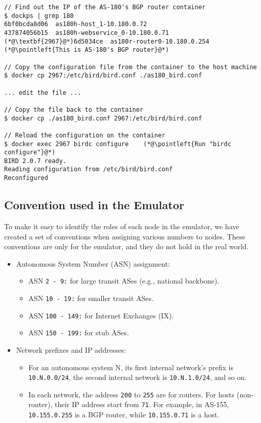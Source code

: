 \begin{lstlisting}
// Find out the IP of the AS-180's BGP router container
$ dockps | grep 180
6bf0bcda8d06  as180h-host_1-10.180.0.72
437874056b15  as180h-webservice_0-10.180.0.71
(*@\textbf{2967}@*)6d5034ce  as180r-router0-10.180.0.254     (*@\pointleft{This is AS-180's BGP router}@*) 

// Copy the configuration file from the container to the host machine
$ docker cp 2967:/etc/bird/bird.conf ./as180_bird.conf

... edit the file ...

// Copy the file back to the container 
$ docker cp ./as180_bird.conf 2967:/etc/bird/bird.conf 

// Reload the configuration on the container
$ docker exec 2967 birdc configure    (*@\pointleft{Run "birdc configure"}@*) 
BIRD 2.0.7 ready.
Reading configuration from /etc/bird/bird.conf
Reconfigured
\end{lstlisting}
 

\subsection{Convention used in the Emulator}

To make it easy to identify the roles of each node in the 
emulator, we have created a set of conventions when assigning
various numbers to nodes. 
These conventions are only for the emulator, and they
do not hold in the real world. 

\begin{itemize}
  \item Autonomous System Number (ASN) assignment:
    \begin{itemize}
      \item ASN \texttt{2 - 9:} for large transit ASes (e.g., national backbone).
      \item ASN \texttt{10 - 19:} for smaller transit ASes.
      \item ASN \texttt{100 - 149:} for Internet Exchanges (IX).
      \item ASN \texttt{150 - 199:} for stub ASes. 
    \end{itemize}

  \item Network prefixes and IP addresses:
    
    \begin{itemize}
      \item For an autonomous system N, its first internal network's prefix
	is \texttt{10.N.0.0/24}, the second internal network
	is \texttt{10.N.1.0/24}, and so on.
   
      \item In each network, the address \texttt{200} to \texttt{255} 
	are for routers. For hosts (non-router), their IP address 
	start from \texttt{71}. For example, in AS-155, 
	\texttt{10.155.0.255} is a BGP router, while \texttt{10.155.0.71}
	is a host. 
    \end{itemize}
     

\end{itemize}



